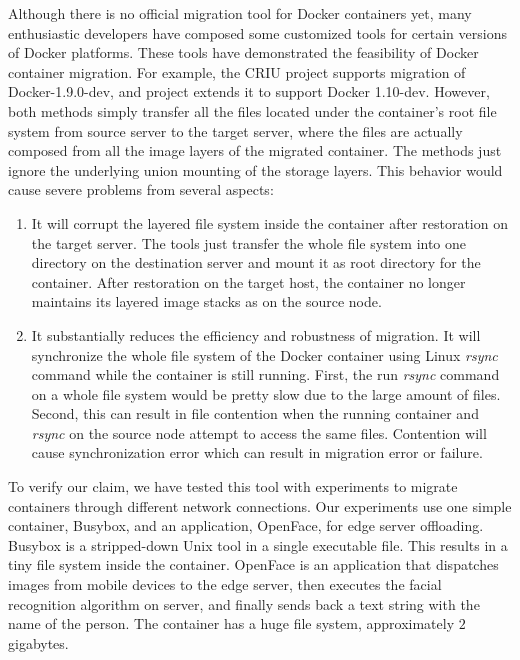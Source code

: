 Although there is no official  migration tool for Docker containers yet, many enthusiastic developers have composed some customized tools for certain versions of Docker platforms. These tools have demonstrated the feasibility of Docker container  migration. For example, the CRIU project \cite{criu} supports migration of Docker-1.9.0-dev, and project \cite{boucherPhaul} 
 extends it to support Docker 1.10-dev. However, both methods simply transfer all the files located under the container's root file system from source server to the target server, where the files are actually composed from all the image layers of the migrated container. The methods just ignore the underlying union mounting of the storage layers.
This behavior would cause severe problems from several aspects:
\begin{enumerate}[series = tobecont]
    \item It will corrupt the layered file system inside the container after restoration  on the target server. The tools just transfer the whole file system into one directory on the destination server and mount it as root directory for the container. After restoration on the target host, the container no longer maintains its layered image stacks as on the source node. 
    \item It substantially reduces the efficiency and robustness of migration.
    It will synchronize the whole file system of the Docker container using Linux \textit{rsync} command while the container is still running. First, the run \textit{rsync} command on a whole file system would be pretty slow due to the large amount of files.  Second, this can result in file contention when the running container and \textit{rsync} on the source node attempt to access the same files. Contention will cause synchronization error which can result in migration error or failure. 
\end{enumerate}

To verify our claim, we have tested this tool with experiments to migrate containers through different network connections. Our experiments use one simple container, Busybox, and an application, OpenFace, for edge server offloading.  Busybox is a stripped-down Unix tool in a single executable file. This results in a tiny file system inside the container. OpenFace\cite{openface2016} is an application that dispatches images from mobile devices to the edge server, then executes the facial recognition algorithm on server, and finally sends back a text string with the name of the person. The container has a huge file system, approximately $2$ gigabytes.

